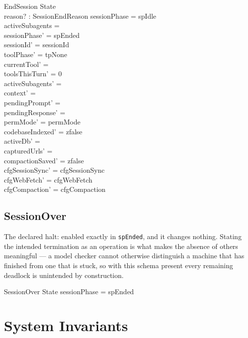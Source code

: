 \documentclass[a4paper,10pt,fleqn]{article}
\begin{document}
\begin{schema}{EndSession}
  \Delta State \\
  reason? : SessionEndReason
  \where
  sessionPhase = spIdle \\
  activeSubagents = \emptyset \\
  sessionPhase' = spEnded \\
  sessionId' = sessionId \\
  toolPhase' = tpNone \\
  currentTool' = \emptyset \\
  toolsThisTurn' = 0 \\
  activeSubagents' = \emptyset \\
  context' = \langle \rangle \\
  pendingPrompt' = \emptyset \\
  pendingResponse' = \emptyset \\
  permMode' = permMode \\
  codebaseIndexed' = zfalse \\
  activeDb' = \emptyset \\
  capturedUrls' = \emptyset \\
  compactionSaved' = zfalse \\
  cfgSessionSync' = cfgSessionSync \\
  cfgWebFetch' = cfgWebFetch \\
  cfgCompaction' = cfgCompaction
\end{schema}

\subsection{SessionOver}

The declared halt: enabled exactly in \texttt{spEnded}, and it changes
nothing. Stating the intended termination as an operation is what makes
the absence of others meaningful --- a model checker cannot otherwise
distinguish a machine that has finished from one that is stuck, so with
this schema present every remaining deadlock is unintended by
construction.

\begin{schema}{SessionOver}
  \Xi State
  \where
  sessionPhase = spEnded
\end{schema}


\section{System Invariants}
\end{document}
